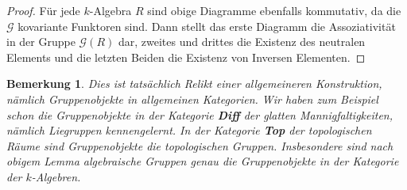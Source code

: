 \documentclass[a4paper, 11pt]{scrartcl}
\theoremstyle{basicstyle}
\newtheorem{bemerkung}[definition]{Bemerkung}
\begin{document}
    \begin{proof}
        Für jede \(k\)-Algebra \(R\) sind obige Diagramme ebenfalls kommutativ, da die \(\mathcal{G}\) kovariante Funktoren sind.
        Dann stellt das erste Diagramm die Assoziativität in der Gruppe \(\mathcal{G}(R)\) dar, zweites und drittes die Existenz des neutralen Elements und die letzten Beiden die Existenz von Inversen Elementen.
    \end{proof}

    \begin{bemerkung}
        Dies ist tatsächlich Relikt einer allgemeineren Konstruktion, nämlich Gruppenobjekte in allgemeinen Kategorien.
        Wir haben zum Beispiel schon die Gruppenobjekte in der Kategorie \textbf{Diff} der glatten Mannigfaltigkeiten, nämlich Liegruppen kennengelernt.
        In der Kategorie \textbf{Top} der topologischen Räume sind Gruppenobjekte die topologischen Gruppen.
        Insbesondere sind nach obigem Lemma algebraische Gruppen genau die Gruppenobjekte in der Kategorie der \(k\)-Algebren.
    \end{bemerkung}
\end{document}
